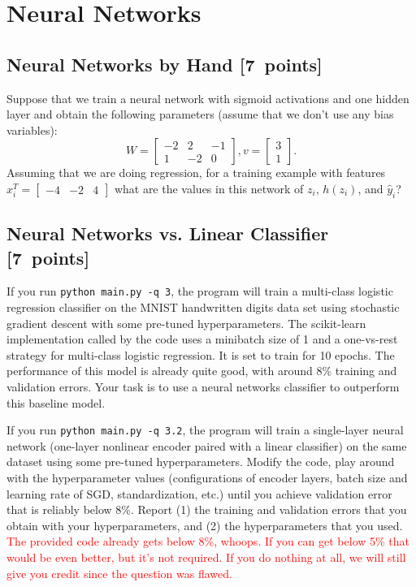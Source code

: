 \documentclass{article}
\newcommand{\blu}[1]{{\textcolor{blu}{#1}}}
\newcommand{\red}[1]{\textcolor{red}{#1}}
\let\ask\blu
\newcommand\pts[1]{\textcolor{pointscolour}{[#1~points]}}
\newcommand{\mat}[1]{\begin{bmatrix}#1\end{bmatrix}}
\begin{document}
\section{Neural Networks}

\subsection{Neural Networks by Hand \pts{7}}

Suppose that we train a neural network with sigmoid activations and one hidden layer and obtain the following parameters (assume that we don't use any bias variables):
\[
W = \mat{-2 & 2 & -1\\1 & -2 & 0}, v = \mat{3 \\1}.
\]
Assuming that we are doing regression, \ask{for a training example with features $x_i^T = \mat{-4 &-2 & 4}$ what are the values in this network of $z_i$, $h(z_i)$, and $\hat{y}_i$?}

\subsection{Neural Networks vs. Linear Classifier \pts{7}}


If you run \texttt{python main.py -q 3}, the program will train a multi-class logistic regression classifier on the MNIST handwritten digits data set using stochastic gradient descent with some pre-tuned hyperparameters.
The scikit-learn implementation called by the code uses a minibatch size of 1 and a one-vs-rest strategy for multi-class logistic regression. It is set to train for 10 epochs.
The performance of this model is already quite good, with around 8\% training and validation errors. Your task is to use a neural networks classifier to outperform this baseline model.

If you run \texttt{python main.py -q 3.2}, the program will train a single-layer neural network (one-layer nonlinear encoder paired with a linear classifier) on the same dataset using some pre-tuned hyperparameters. Modify the code, play around with the hyperparameter values (configurations of encoder layers, batch size and learning rate of SGD, standardization, etc.) until you achieve validation error that is reliably below 8\%. \ask{Report (1) the training and validation errors that you obtain with your hyperparameters, and (2) the hyperparameters that you used.}
\red{The provided code already gets below 8\%, whoops. If you can get below 5\% that would be even better, but it's not required. If you do nothing at all, we will still give you credit since the question was flawed.}
\end{document}
